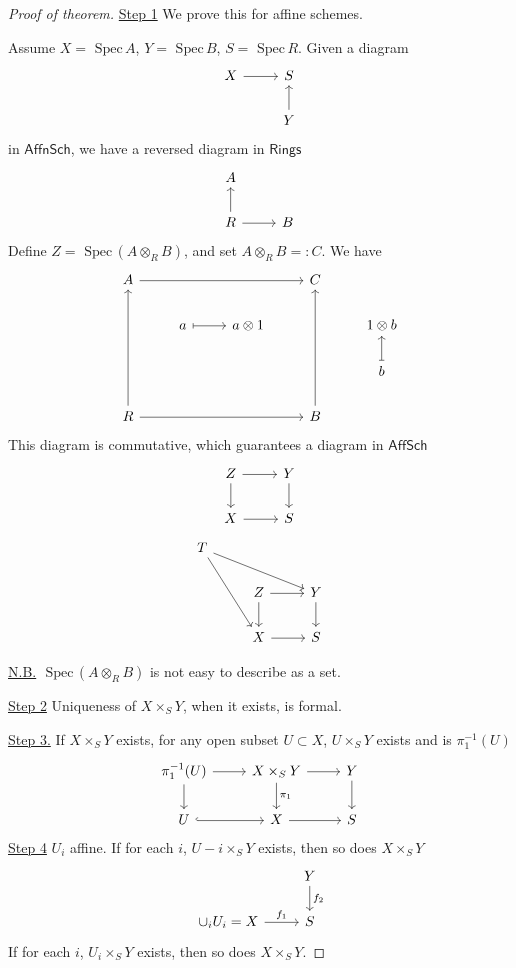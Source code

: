 \documentclass[11pt]{article}
\theoremstyle{definition}
\newcommand{\spec}{\text{ Spec}\,}
\begin{document}
\begin{proof}[Proof of theorem]
\underline{Step 1} We prove this for affine schemes.

Assume $X=\spec A$, $Y=\spec B$, $S=\spec R$. Given  a diagram
$$
\begin{tikzcd}
X \arrow[r] & S \\
 & Y \arrow[u]
\end{tikzcd}
$$
in $\mathsf{AffnSch}$, we have a reversed diagram in $\mathsf{Rings}$
$$
\begin{tikzcd}
A &  \\
R \arrow[u] \arrow[r] & B
\end{tikzcd}
$$
Define $Z=\spec(A\otimes_R B)$, and set $A\otimes_R B=:C$. We have 
$$
\begin{tikzcd}
A \arrow[rrr] &  &  & C &  \\
 & a \arrow[r, maps to] & a\otimes 1 &  & 1\otimes b \\
 &  &  &  & b \arrow[u, maps to] \\
R \arrow[uuu] \arrow[rrr] &  &  & B \arrow[uuu] & 
\end{tikzcd}
$$
This diagram is commutative, which guarantees a diagram in $\mathsf{AffSch}$ 
$$
\begin{tikzcd}
Z \arrow[r] \arrow[d] & Y \arrow[d] \\
X \arrow[r] & S
\end{tikzcd}
$$
$$
\begin{tikzcd}
T \arrow[rdd] \arrow[rrd] &  &  \\
 & Z \arrow[d] \arrow[r] & Y \arrow[d] \\
 & X \arrow[r] & S
\end{tikzcd}
$$

\underline{N.B.} $\spec (A\otimes_R B)$ is not easy to describe as a set.


\underline{Step 2} Uniqueness of $X\times_S Y$, when it  exists, is formal.

\underline{Step 3.} If $X\times_S Y$ exists, for any open subset $U\subset X$, $U\times_S Y$ exists and is $\pi_1^{-1}(U)$
$$
\begin{tikzcd}
\pi_1^{-1}(U) \arrow[d] \arrow[r] & X\times_S Y \arrow[d, "\pi_1"] \arrow[r] & Y \arrow[d] \\
U \arrow[r, hook] & X \arrow[r] & S
\end{tikzcd}
$$
\underline{Step 4} $U_i$ affine. If for each $i$, $U-i\times_S Y$ exists, then so does $X\times_S Y$
$$
\begin{tikzcd}
 & Y \arrow[d, "f_2"] \\
\cup_i U_i=X \arrow[r, "f_1"] & S
\end{tikzcd}
$$
If for each $i$, $U_i\times_S Y$ exists, then so does $X\times_S Y$.


\end{proof}
\end{document}
